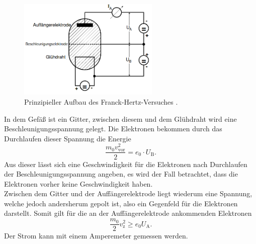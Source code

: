     \begin{figure}
         \centering 
         \includegraphics[width=0.6\textwidth]{bilder/prinzipieller_aufbau.png}
         \caption{Prinzipieller Aufbau des Franck-Hertz-Versuches \cite{anleitung}.}
         \label{fig:prinzipieller_aufbau}
    \end{figure}

    \noindent In dem Gefäß ist ein Gitter, zwischen diesem und dem Glühdraht wird eine Beschleunigungsspannung gelegt. Die Elektronen bekommen durch das 
    Durchlaufen dieser Spannung die Energie 
    \begin{equation*}
        \frac{m_0 v^2_{\text{vor}}}{2} = e_0 \cdot U_{\text{B}}. 
    \end{equation*}
    Aus dieser lässt sich eine Geschwindigkeit für die Elektronen nach Durchlaufen der Beschleunigungsspannung angeben, es wird der Fall betrachtet, dass die
    Elektronen vorher keine Geschwindigkeit haben. \\
    Zwischen dem Gitter und der Auffängerelektrode liegt wiederum eine Spannung, welche jedoch andersherum gepolt ist, also ein Gegenfeld für die Elektronen darstellt. 
    Somit gilt für die an der Auffängerelektrode ankommenden Elektronen
    \begin{equation*}
        \frac{m_0}{2} v_{\text{z}}^2 \geq e_0 U_{\text{A}}. 
    \end{equation*}
    Der Strom kann mit einem Amperemeter  gemessen werden. 

